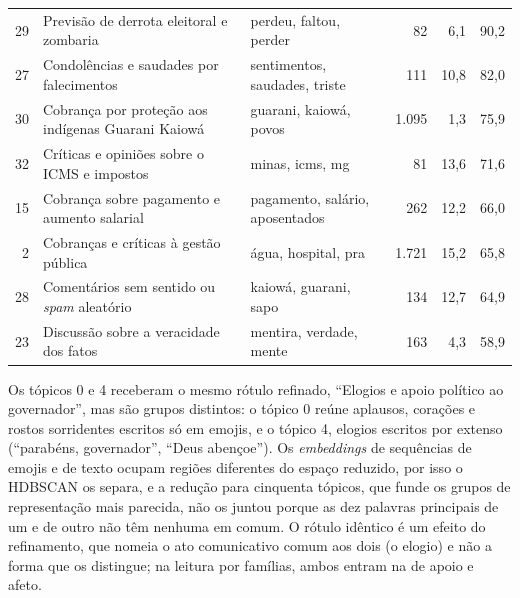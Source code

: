 \begin{table}[htb]
\begin{tabular}{r>{\raggedright\arraybackslash}p{5.0cm}>{\raggedright\arraybackslash}p{3.9cm}rrr}
29 & Previsão de derrota eleitoral e zombaria & perdeu, faltou, perder & 82 & 6,1 & 90,2 \\
27 & Condolências e saudades por falecimentos & sentimentos, saudades, triste & 111 & 10,8 & 82,0 \\
30 & Cobrança por proteção aos indígenas Guarani Kaiowá & guarani, kaiowá, povos & 1.095 & 1,3 & 75,9 \\
32 & Críticas e opiniões sobre o ICMS e impostos & minas, icms, mg & 81 & 13,6 & 71,6 \\
15 & Cobrança sobre pagamento e aumento salarial & pagamento, salário, aposentados & 262 & 12,2 & 66,0 \\
2 & Cobranças e críticas à gestão pública & água, hospital, pra & 1.721 & 15,2 & 65,8 \\
28 & Comentários sem sentido ou \emph{spam} aleatório & kaiowá, guarani, sapo & 134 & 12,7 & 64,9 \\
23 & Discussão sobre a veracidade dos fatos & mentira, verdade, mente & 163 & 4,3 & 58,9 \\
\bottomrule
\end{tabular}
\end{table}

Os tópicos 0 e 4 receberam o mesmo rótulo refinado, ``Elogios e apoio político ao governador'', mas são grupos distintos: o tópico 0 reúne aplausos, corações e rostos sorridentes escritos só em emojis, e o tópico 4, elogios escritos por extenso (``parabéns, governador'', ``Deus abençoe''). Os \emph{embeddings} de sequências de emojis e de texto ocupam regiões diferentes do espaço reduzido, por isso o HDBSCAN os separa, e a redução para cinquenta tópicos, que funde os grupos de representação mais parecida, não os juntou porque as dez palavras principais de um e de outro não têm nenhuma em comum. O rótulo idêntico é um efeito do refinamento, que nomeia o ato comunicativo comum aos dois (o elogio) e não a forma que os distingue; na leitura por famílias, ambos entram na de apoio e afeto.

